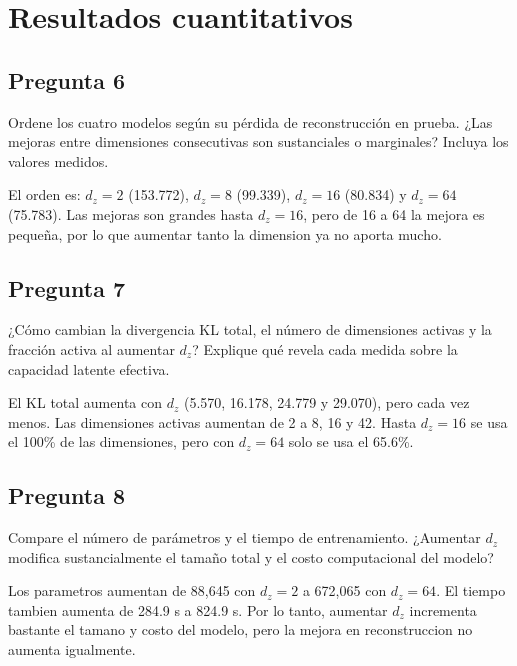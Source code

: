 \documentclass[11pt,letterpaper]{article}
\begin{document}
\section{Resultados cuantitativos}


\subsection*{Pregunta 6}
Ordene los cuatro modelos según su pérdida de reconstrucción en prueba. ¿Las
mejoras entre dimensiones consecutivas son sustanciales o marginales? Incluya
los valores medidos.
\begin{responsebox}
El orden es: $d_z=2$ (153.772), $d_z=8$ (99.339), $d_z=16$ (80.834) y $d_z=64$ (75.783). Las mejoras son grandes hasta $d_z=16$, pero de 16 a 64 la mejora es pequeña, por lo que aumentar tanto la dimension ya no aporta mucho.
\end{responsebox}

\subsection*{Pregunta 7}
¿Cómo cambian la divergencia KL total, el número de dimensiones activas y la
fracción activa al aumentar $d_z$? Explique qué revela cada medida sobre la
capacidad latente efectiva.
\begin{responsebox}
El KL total aumenta con $d_z$ (5.570, 16.178, 24.779 y 29.070), pero cada vez menos. Las dimensiones activas aumentan de 2 a 8, 16 y 42. Hasta $d_z=16$ se usa el 100\% de las dimensiones, pero con $d_z=64$ solo se usa el 65.6\%.
\end{responsebox}

\subsection*{Pregunta 8}
Compare el número de parámetros y el tiempo de entrenamiento. ¿Aumentar $d_z$
modifica sustancialmente el tamaño total y el costo computacional del modelo?
\begin{responsebox}
Los parametros aumentan de 88,645 con $d_z=2$ a 672,065 con $d_z=64$. El tiempo tambien aumenta de 284.9 s a 824.9 s. Por lo tanto, aumentar $d_z$ incrementa bastante el tamano y costo del modelo, pero la mejora en reconstruccion no aumenta igualmente.
\end{responsebox}
\end{document}
